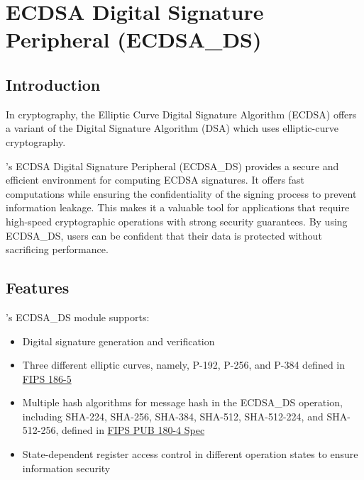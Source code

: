 \documentclass[main\_\_EN.tex]{subfiles}
\begin{document}

\ifglobal
\else
    \listoftodos
    {\let\clearpage\relax \listofdonetodos}
    \tableofcontents
\fi



\hypertarget{ecdsa}{}
\chapter{ECDSA Digital Signature Peripheral (ECDSA\_DS)}
\label{mod:ecdsa}



\section{Introduction}

In cryptography, the Elliptic Curve Digital Signature Algorithm (ECDSA) offers a variant of the Digital Signature Algorithm (DSA) which uses elliptic-curve cryptography.

\chipname{}'s ECDSA Digital Signature Peripheral (ECDSA\_DS) provides a secure and efficient environment for computing ECDSA signatures. It offers fast computations while ensuring the confidentiality of the signing process to prevent information leakage. This makes it a valuable tool for applications that require high-speed cryptographic operations with strong security guarantees. By using ECDSA\_DS, users can be confident that their data is protected without sacrificing performance.



\section{Features}
\label{sec:ecdsa-features}

\chipname{}'s ECDSA\_DS module supports:

\begin{itemize}
    \item Digital signature generation and verification
    \item Three different elliptic curves, namely, P-192, P-256, and P-384 defined in \href{https://nvlpubs.nist.gov/nistpubs/FIPS/NIST.FIPS.186-5.pdf}{FIPS 186-5}
    \item Multiple hash algorithms for message hash in the ECDSA\_DS operation, including SHA-224, SHA-256, SHA-384, SHA-512, SHA-512-224, and SHA-512-256, defined in \href{https://doi.org/10.6028/NIST.FIPS.180-4}{FIPS PUB 180-4 Spec}
    \item State-dependent register access control in different operation states to ensure information security
\end{itemize}
\end{document}
